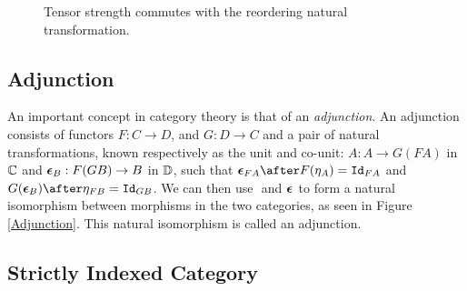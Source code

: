 \begin{figure}
    \centering
    \begin{framed}
        \centering
    \end{framed}
    \caption{Tensor strength commutes with the reordering natural transformation.}
    \label{TensorStrengthAlpha}
\end{figure}






\subsection{Adjunction}\label{WhatsAnAdjunction}
An important concept in category theory is that of an \textit{adjunction}. An adjunction consists of functors $F: C\rightarrow D$, and  $G: D\rightarrow C$ and a pair of natural transformations, known respectively as the unit and co-unit: $\unit{A}: A \rightarrow G(F A)$ in $\mathbb{C}$ and $\boldsymbol{\epsilon}_{B}: F(G B) \rightarrow B$ in $\mathbb{D}$, such that $\counit{F A}\after F(\eta_A) = \Id{F A}$ and $G(\counit{B})\after \eta_{F B} = \Id{G B}$. We can then use $\unit{}$ and $\boldsymbol{\epsilon}_{}$ to form a natural isomorphism between morphisms in the two categories, as seen in Figure \ref{Adjunction}. This natural isomorphism is called an adjunction.


\subsection{Strictly Indexed Category}\label{IndexedCategoryDefinition}

